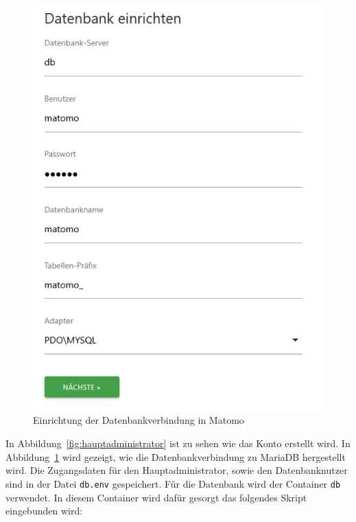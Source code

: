 \begin{figure}[H]
\begin{minipage}{0.49\textwidth}
        \includegraphics[width=\linewidth, keepaspectratio]{images/setup-datenbank.png}
        \caption{Einrichtung der Datenbankverbindung in Matomo}
        \label{fig:setup-datenbank}
    \end{minipage}
\end{figure}

In Abbildung~\ref{fig:hauptadministrator} ist zu sehen wie das Konto erstellt wird. In Abbildung~\ref{fig:setup-datenbank} wird gezeigt, wie die Datenbankverbindung zu MariaDB hergestellt wird. Die Zugangsdaten für den Hauptadministrator, sowie den Datenbanknutzer sind in der Datei \texttt{db.env} gespeichert. Für die Datenbank wird der Container \texttt{db} verwendet. In diesem Container wird dafür gesorgt das folgendes Skript eingebunden wird: 

\begin{figure}[H]
    \centering
    \begin{minipage}{\textwidth}
        
    \end{minipage}
\end{figure}


